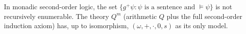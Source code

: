 In monadic second-order logic, the set $\{g^{+}\psi : \psi \text{ is a sentence and } \models \psi\}$ is not recursively enumerable. The theory $Q^m$ (arithmetic $Q$ plus the full second-order induction axiom) has, up to isomorphism, $(\omega, +, \cdot, 0, s)$ as its only model.

